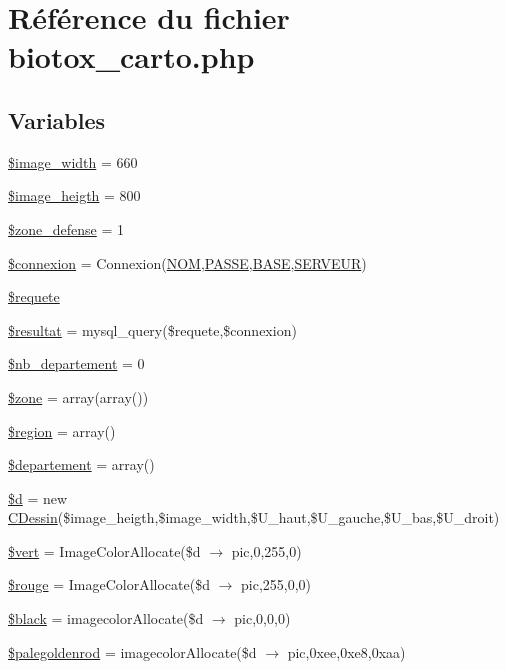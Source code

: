 \hypertarget{biotox__carto_8php}{
\section{R\'{e}f\'{e}rence du fichier biotox\_\-carto.php}
\label{biotox__carto_8php}
}
\subsection*{Variables}
\begin{CompactItemize}
\item 
\hyperlink{biotox__carto_8php_a0}{\$image\_\-width} = 660
\item 
\hyperlink{biotox__carto_8php_a1}{\$image\_\-heigth} = 800
\item 
\hyperlink{biotox__carto_8php_a2}{\$zone\_\-defense} = 1
\item 
\hyperlink{biotox__carto_8php_a3}{\$connexion} = Connexion(\hyperlink{pma__connect_8php_a0}{NOM},\hyperlink{pma__connect_8php_a1}{PASSE},\hyperlink{pma__connect_8php_a3}{BASE},\hyperlink{pma__connect_8php_a2}{SERVEUR})
\item 
\hyperlink{biotox__carto_8php_a4}{\$requete}
\item 
\hyperlink{biotox__carto_8php_a5}{\$resultat} = mysql\_\-query(\$requete,\$connexion)
\item 
\hyperlink{biotox__carto_8php_a6}{\$nb\_\-departement} = 0
\item 
\hyperlink{biotox__carto_8php_a7}{\$zone} = array(array())
\item 
\hyperlink{biotox__carto_8php_a8}{\$region} = array()
\item 
\hyperlink{biotox__carto_8php_a9}{\$departement} = array()
\item 
\hyperlink{biotox__carto_8php_a10}{\$d} = new \hyperlink{classCDessin}{CDessin}(\$image\_\-heigth,\$image\_\-width,\$U\_\-haut,\$U\_\-gauche,\$U\_\-bas,\$U\_\-droit)
\item 
\hyperlink{biotox__carto_8php_a11}{\$vert} = Image\-Color\-Allocate(\$d $\rightarrow$ pic,0,255,0)
\item 
\hyperlink{biotox__carto_8php_a12}{\$rouge} = Image\-Color\-Allocate(\$d $\rightarrow$ pic,255,0,0)
\item 
\hyperlink{biotox__carto_8php_a13}{\$black} = imagecolor\-Allocate(\$d $\rightarrow$ pic,0,0,0)
\item 
\hyperlink{biotox__carto_8php_a14}{\$palegoldenrod} = imagecolor\-Allocate(\$d $\rightarrow$ pic,0xee,0xe8,0xaa)

\end{CompactItemize}
